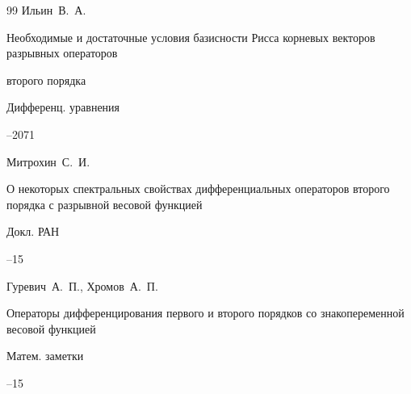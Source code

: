 \begin{thebibliography}{99}
\by Ильин~В.~А.

\paper Необходимые и достаточные условия базисности Рисса корневых векторов разрывных операторов 

второго порядка

\jour Дифференц. уравнения




--2071










\by Митрохин~С.~И.

\paper О некоторых спектральных свойствах дифференциальных операторов второго порядка с разрывной весовой функцией 

\jour Докл. РАН




--15






\by	Гуревич~А.~П., Хромов~А.~П.

\paper Операторы дифференцирования первого и второго порядков со знакопеременной весовой функцией

\jour Матем. заметки




--15









\end{thebibliography}
